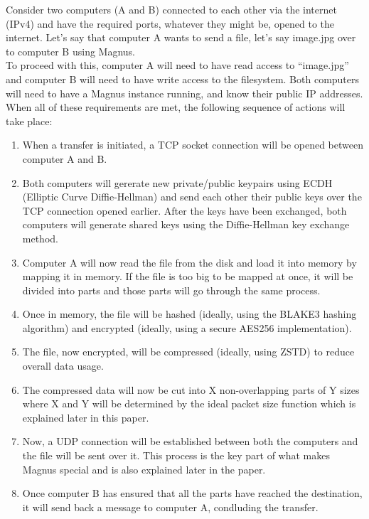 \documentclass{article}
\begin{document}
Consider two computers (A and B) connected to each other via the internet (IPv4)
and have the required ports, whatever they might be, opened to the internet. Let's
say that computer A wants to send a file, let's say image.jpg over to computer B using Magnus. \\


To proceed with this, computer A will need to have read access to ``image.jpg'' and
computer B will need to have write access to the filesystem. Both computers will need
to have a Magnus instance running, and know their public IP addresses. \\


When all of these requirements are met, the following sequence of actions will take place:
\begin{enumerate}
  \item When a transfer is initiated, a TCP socket connection will be opened between
        computer A and B.
  \item Both computers will gererate new private/public keypairs using ECDH
        (Elliptic Curve Diffie-Hellman) and send each other their public keys over
        the TCP connection opened earlier. After the keys have been exchanged, both
        computers will generate shared keys using the Diffie-Hellman key exchange method.
  \item Computer A will now read the file from the disk and load it into
        memory by mapping it in memory. If the file is too big to be mapped at
        once, it will be divided into parts and those parts will go through the same process.
  \item Once in memory, the file will be hashed (ideally, using the BLAKE3 hashing algorithm)
        and encrypted (ideally, using a secure AES256 implementation).
  \item The file, now encrypted, will be compressed (ideally, using ZSTD) to reduce overall data usage.
  \item The compressed data will now be cut into X non-overlapping parts of Y sizes where
        X and Y will be determined by the ideal packet size function which is explained later in this paper.
  \item Now, a UDP connection will be established between both the computers and the file will be sent
        over it. This process is the key part of what makes Magnus special and is also explained later
        in the paper.
  \item Once computer B has ensured that all the parts have reached the destination, it will send back a
        message to computer A, condluding the transfer.

\end{enumerate}
\end{document}
